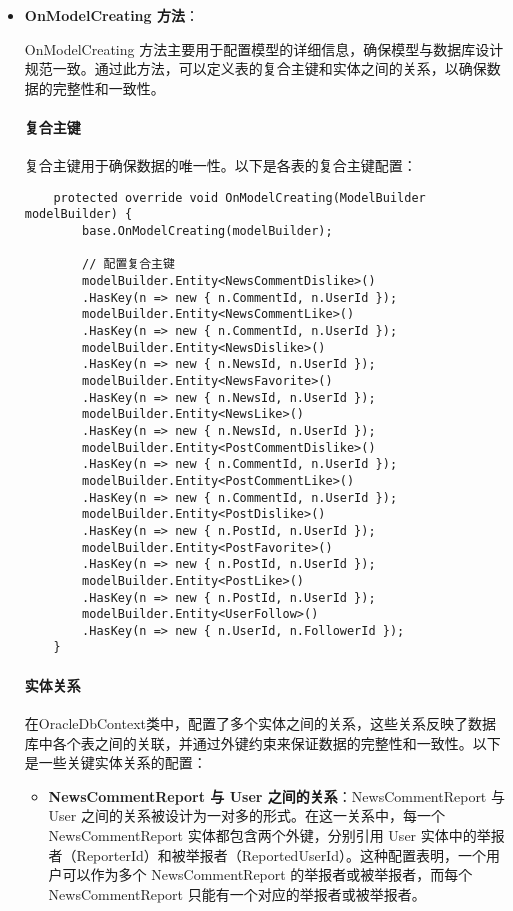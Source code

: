 \begin{itemize}
	\item \textbf{OnModelCreating 方法}：
	
	OnModelCreating 方法主要用于配置模型的详细信息，确保模型与数据库设计规范一致。通过此方法，可以定义表的复合主键和实体之间的关系，以确保数据的完整性和一致性。
	
	
	\paragraph{复合主键}复合主键用于确保数据的唯一性。以下是各表的复合主键配置：
	\begin{verbatim}
	protected override void OnModelCreating(ModelBuilder modelBuilder) {
		base.OnModelCreating(modelBuilder);
	
		// 配置复合主键
		modelBuilder.Entity<NewsCommentDislike>()
		.HasKey(n => new { n.CommentId, n.UserId });
		modelBuilder.Entity<NewsCommentLike>()
		.HasKey(n => new { n.CommentId, n.UserId });
		modelBuilder.Entity<NewsDislike>()
		.HasKey(n => new { n.NewsId, n.UserId });
		modelBuilder.Entity<NewsFavorite>()
		.HasKey(n => new { n.NewsId, n.UserId });
		modelBuilder.Entity<NewsLike>()
		.HasKey(n => new { n.NewsId, n.UserId });
		modelBuilder.Entity<PostCommentDislike>()
		.HasKey(n => new { n.CommentId, n.UserId });
		modelBuilder.Entity<PostCommentLike>()
		.HasKey(n => new { n.CommentId, n.UserId });
		modelBuilder.Entity<PostDislike>()
		.HasKey(n => new { n.PostId, n.UserId });
		modelBuilder.Entity<PostFavorite>()
		.HasKey(n => new { n.PostId, n.UserId });
		modelBuilder.Entity<PostLike>()
		.HasKey(n => new { n.PostId, n.UserId });
		modelBuilder.Entity<UserFollow>()
		.HasKey(n => new { n.UserId, n.FollowerId });
	}
	\end{verbatim}
	
	\paragraph{实体关系}在OracleDbContext类中，配置了多个实体之间的关系，这些关系反映了数据库中各个表之间的关联，并通过外键约束来保证数据的完整性和一致性。以下是一些关键实体关系的配置：
	
	\begin{itemize}
		\item \textbf{NewsCommentReport 与 User 之间的关系}：NewsCommentReport 与 User 之间的关系被设计为一对多的形式。在这一关系中，每一个 NewsCommentReport 实体都包含两个外键，分别引用 User 实体中的举报者（ReporterId）和被举报者（ReportedUserId）。这种配置表明，一个用户可以作为多个 NewsCommentReport 的举报者或被举报者，而每个 NewsCommentReport 只能有一个对应的举报者或被举报者。
		

\end{itemize}
\end{itemize}
